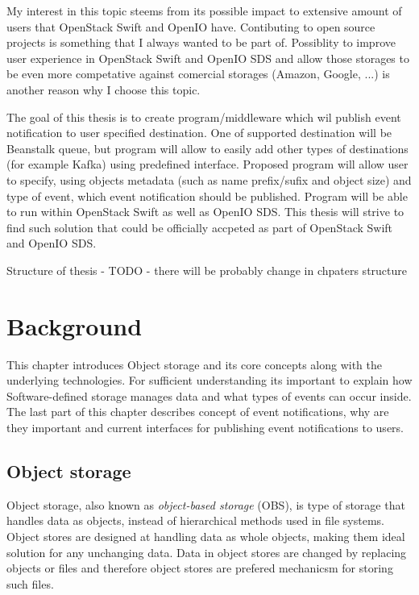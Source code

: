 My interest in this topic steems from its possible impact to extensive amount of users that OpenStack Swift and OpenIO have. Contibuting to open source projects is something that I always wanted to be part of. Possiblity to improve user experience in OpenStack Swift and OpenIO SDS and allow those storages to be even more competative against comercial storages (Amazon, Google, ...) is another reason why I choose this topic.

The goal of this thesis is to create program/middleware which wil publish event notification to user specified destination. One of supported destination will be Beanstalk queue, but program will allow to easily add other types of destinations (for example Kafka) using predefined interface. Proposed program will allow user to specify, using objects metadata (such as name prefix/sufix and object size) and type of event, which event notification should be published. Program will be able to run within OpenStack Swift as well as OpenIO SDS. This thesis will strive to find such solution that could be officially accpeted as part of OpenStack Swift and OpenIO SDS.

Structure of thesis - TODO - there will be probably change in chpaters structure

\chapter{Background}

This chapter introduces Object storage and its core concepts along with the underlying technologies. For sufficient understanding its important to explain how Software-defined storage manages data and what types of events can occur inside. The last part of this chapter describes concept of event notifications, why are they important and current interfaces for publishing event notifications to users.

\section{Object storage}
    Object storage, also known as \textit{object-based storage} (OBS), is type of storage that handles data as objects, instead of hierarchical methods used in file systems\cite{objectBasedStorage}. Object stores are designed at handling data as whole objects, making them ideal solution for any unchanging data. Data in object stores are changed by replacing objects or files and therefore object stores are prefered mechanicsm for storing such files\cite{networkStorage}.

